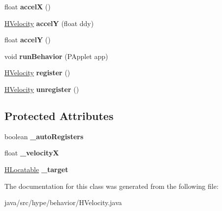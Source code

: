 \begin{DoxyCompactItemize}
\item 
\hypertarget{classhype_1_1behavior_1_1_h_velocity_ab44947a8dd5df4a12ee2cd3295beea59}{float {\bfseries accel\-X} ()}\label{classhype_1_1behavior_1_1_h_velocity_ab44947a8dd5df4a12ee2cd3295beea59}

\item 
\hypertarget{classhype_1_1behavior_1_1_h_velocity_ad1dc3d8cf2f5ce87c2a5c5dd5048e399}{\hyperlink{classhype_1_1behavior_1_1_h_velocity}{H\-Velocity} {\bfseries accel\-Y} (float ddy)}\label{classhype_1_1behavior_1_1_h_velocity_ad1dc3d8cf2f5ce87c2a5c5dd5048e399}

\item 
\hypertarget{classhype_1_1behavior_1_1_h_velocity_a71da143ee1531bb9a57a9d155eaa7028}{float {\bfseries accel\-Y} ()}\label{classhype_1_1behavior_1_1_h_velocity_a71da143ee1531bb9a57a9d155eaa7028}

\item 
\hypertarget{classhype_1_1behavior_1_1_h_velocity_acc6d4560989de30788ec2ae4f1ea6913}{void {\bfseries run\-Behavior} (P\-Applet app)}\label{classhype_1_1behavior_1_1_h_velocity_acc6d4560989de30788ec2ae4f1ea6913}

\item 
\hypertarget{classhype_1_1behavior_1_1_h_velocity_acefec10ae890e65be256238ed0e2800f}{\hyperlink{classhype_1_1behavior_1_1_h_velocity}{H\-Velocity} {\bfseries register} ()}\label{classhype_1_1behavior_1_1_h_velocity_acefec10ae890e65be256238ed0e2800f}

\item 
\hypertarget{classhype_1_1behavior_1_1_h_velocity_a5673f18c65637da5063bb7b9b66c7905}{\hyperlink{classhype_1_1behavior_1_1_h_velocity}{H\-Velocity} {\bfseries unregister} ()}\label{classhype_1_1behavior_1_1_h_velocity_a5673f18c65637da5063bb7b9b66c7905}

\end{DoxyCompactItemize}
\subsection*{Protected Attributes}
\begin{DoxyCompactItemize}
\item 
\hypertarget{classhype_1_1behavior_1_1_h_velocity_a406b8d2770d53f58f2acb61c281ac4e2}{boolean {\bfseries \-\_\-auto\-Registers}}\label{classhype_1_1behavior_1_1_h_velocity_a406b8d2770d53f58f2acb61c281ac4e2}

\item 
\hypertarget{classhype_1_1behavior_1_1_h_velocity_a9f3e36117e086a406bd2cdda2493687f}{float {\bfseries \-\_\-velocity\-X}}\label{classhype_1_1behavior_1_1_h_velocity_a9f3e36117e086a406bd2cdda2493687f}

\item 
\hypertarget{classhype_1_1behavior_1_1_h_velocity_a9dde29b6b58fe3eb8827dff834a74edc}{\hyperlink{interfacehype_1_1interfaces_1_1_h_locatable}{H\-Locatable} {\bfseries \-\_\-target}}\label{classhype_1_1behavior_1_1_h_velocity_a9dde29b6b58fe3eb8827dff834a74edc}

\end{DoxyCompactItemize}


The documentation for this class was generated from the following file\-:\begin{DoxyCompactItemize}
\item 
java/src/hype/behavior/H\-Velocity.\-java\end{DoxyCompactItemize}
